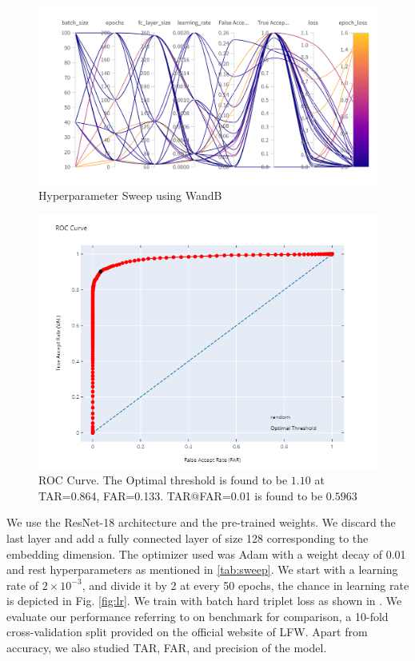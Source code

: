 \documentclass[aps,prb,twocolumn,superscriptaddress,floatfix,longbibliography, nofootinbib]{revtex4-2}
\newif\ifptitle
\newif\ifpnumber
\newcounter{para}
\newcommand\ptitle[1]{\par\refstepcounter{para}
{\ifpnumber{\noindent\textcolor{lightgray}{\textbf{\thepara}}\indent}\fi}
{\ifptitle{\textbf{[{#1}]}}\fi}}
\begin{document}
\begin{figure}[t]
    \includegraphics[clip=true,width=2\columnwidth]{face_unlock sweep.png}
    \caption{Hyperparameter Sweep using WandB} 
     \label{fig:sweep}
\end{figure}

\begin{figure}[h]
    \includegraphics[clip=true,width=\columnwidth]{roc.png}
    \caption{ROC Curve. The Optimal threshold is found to be $1.10$ at TAR=0.864, FAR=0.133. TAR$@$FAR=0.01 is found to be $0.5963$} 
     \label{fig:roclfw}
\end{figure}

\ptitle{Outcome} We use the ResNet-18 \cite{7780459} architecture and the pre-trained weights. We discard the last layer and add a fully connected layer of size 128 corresponding to the embedding dimension. The optimizer used was Adam with a weight decay of 0.01 and rest hyperparameters as mentioned in \ref{tab:sweep}. We start with a learning
rate of $2\times10^{-3}$, and divide it by 2 at every 50 epochs, the chance in learning rate is depicted in Fig. \ref{fig:lr}. We train with batch hard triplet loss as shown in \textcite{tripletmining}. We evaluate our performance referring to \textcite{tamerfacenet} on benchmark for comparison, a 10-fold cross-validation split provided on the official website of LFW. Apart from accuracy, we also studied TAR, FAR, and precision of the model.
\end{document}
